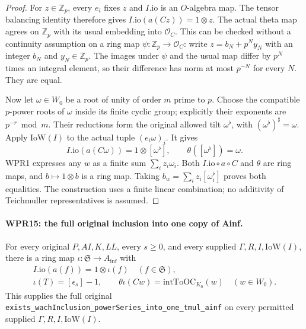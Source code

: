 \documentclass[11pt,a4paper]{article}
\numberwithin{equation}{section}
\theoremstyle{remark}\newtheorem{remark}[theorem]{Remark}
\begin{document}
\begin{proof}
For $z\in\mathbb Z_p$, every $e_i$ fixes $z$ and
$I.\mathrm{io}$ is an $O$-algebra map. The tensor balancing
identity therefore gives
$I.\mathrm{io}(a(Cz))=1\otimes z$.
The actual theta map agrees on $\mathbb Z_p$ with its usual
embedding into $\mathcal O_C$. This can be checked without a
continuity assumption on a ring map $\psi:\mathbb Z_p\to\mathcal O_C$:
write $z=b_N+p^Ny_N$ with an integer $b_N$ and
$y_N\in\mathbb Z_p$. The images under $\psi$ and the usual map
differ by $p^N$ times an integral element, so their difference
has norm at most $p^{-N}$ for every $N$. They are equal.

Now let $\omega\in W_0$ be a root of unity of order $m$
prime to $p$. Choose the compatible $p$-power roots of $\omega$
inside its finite cyclic group; explicitly their exponents are
$p^{-r}\bmod m$. Their reductions form the original allowed
tilt $\omega^\flat$, with $(\omega^\flat)^\sharp=\omega$.
Apply $\mathrm{IoW}(I)$ to the actual tuple $(e_i\omega)_i$.
It gives
\[
 I.\mathrm{io}(a(C\omega))=1\otimes[\omega^\flat],
       \qquad \theta([\omega^\flat])=\omega.
\]
WPR1 expresses any $w$ as a finite sum
$\sum_i z_i\omega_i$. Both $I.\mathrm{io}\circ a\circ C$ and
$\theta$ are ring maps, and $b\mapsto1\otimes b$ is a ring
map. Taking $b_w=\sum_i z_i[\omega_i^\flat]$ proves both
equalities. The construction uses a finite linear combination;
no additivity of Teichmuller representatives is assumed.
\end{proof}

\paragraph{WPR15: the full original inclusion into one copy of Ainf.}
\label{claim:WPR15}
For every original $P,AI,K,LL$, every $s\geq0$, and every
supplied $\Gamma,R,I,\mathrm{IoW}(I)$, there is a ring map
$\iota:\mathfrak S\to A_{\mathrm{inf}}$ with
\[
 \begin{gathered}
 I.\mathrm{io}(a(f))=1\otimes\iota(f)\quad(f\in\mathfrak S),\\
 \iota(T)=[\epsilon_s]-1,\qquad
 \theta\iota(Cw)=\mathrm{intToOC}_{K_0}(w)\quad(w\in W_0).
 \end{gathered}                                                     \tag{WPR.17}
\]
This supplies the full original
\texttt{exists\_\allowbreak wach\allowbreak Inclusion\_\allowbreak power\allowbreak Series\_\allowbreak into\_\allowbreak one\_\allowbreak tmul\_\allowbreak ainf}
on every permitted supplied $\Gamma,R,I,\mathrm{IoW}(I)$.
\end{document}
